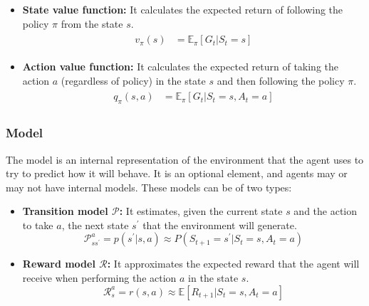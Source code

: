 \begin{itemize}
    \item \textbf{State value function:} It calculates the expected return of following the policy $\pi$ from the state $s$.
    \begin{align}
    \begin{split}
        v_\pi(s) &= \mathbb{E}_\pi[G_t|S_t = s]%
    \end{split}
    \end{align}
    \item \textbf{Action value function:} It calculates the expected return of taking the action $a$ (regardless of policy) in the state $s$ and then following the policy $\pi$.
    \begin{align}
    \begin{split}
        q_\pi(s,a) &= \mathbb{E}_\pi[G_t |S_t = s,A_t = a]%
    \end{split}
    \end{align}
\end{itemize}

\subsubsection*{Model}

The model is an internal representation of the environment that the agent uses to try to predict how it will behave. It is an optional element, and agents may or may not have internal models. These models can be of two types:

\begin{itemize}
    \item \textbf{Transition model $\mathcal{P}$:} It estimates, given the current state $s$ and the action to take $a$, the next state $s^\prime$ that the environment will generate.
    \begin{equation}
        \mathcal{P}^a_{ss^\prime} = p(s^\prime|s,a) \approx P(S_{t+1} = s^\prime|S_t = s, A_t = a)
    \end{equation}
    \item \textbf{Reward model $\mathcal{R}$:} It approximates the expected reward that the agent will receive when performing the action $a$ in the state $s$.
    \begin{equation}
        \mathcal{R}^a_s = r(s,a) \approx \mathbb{E}[R_{t+1}| S_t = s, A_t = a]
    \end{equation}
\end{itemize}

